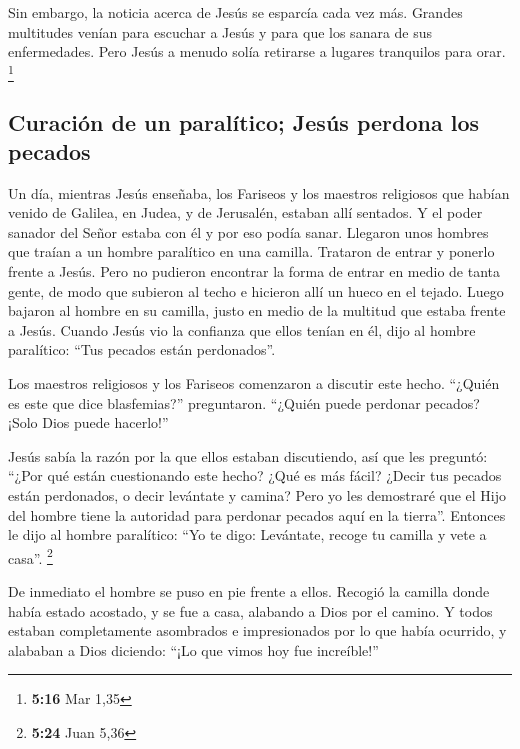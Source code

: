  Sin embargo, la noticia acerca de Jesús se esparcía cada
vez más. Grandes multitudes venían para escuchar a Jesús y para que los
sanara de sus enfermedades.  Pero Jesús a menudo solía
retirarse a lugares tranquilos para orar. \footnote{\textbf{5:16} Mar
  1,35}

\hypertarget{curaciuxf3n-de-un-paraluxedtico-jesuxfas-perdona-los-pecados}{%
\subsection{Curación de un paralítico; Jesús perdona los
pecados}\label{curaciuxf3n-de-un-paraluxedtico-jesuxfas-perdona-los-pecados}}

 Un día, mientras Jesús enseñaba, los Fariseos y los
maestros religiosos que habían venido de Galilea, en Judea, y de
Jerusalén, estaban allí sentados. Y el poder sanador del Señor estaba
con él y por eso podía sanar.  Llegaron unos hombres que
traían a un hombre paralítico en una camilla. Trataron de entrar y
ponerlo frente a Jesús.  Pero no pudieron encontrar la
forma de entrar en medio de tanta gente, de modo que subieron al techo e
hicieron allí un hueco en el tejado. Luego bajaron al hombre en su
camilla, justo en medio de la multitud que estaba frente a Jesús.
 Cuando Jesús vio la confianza que ellos tenían en él,
dijo al hombre paralítico: ``Tus pecados están perdonados''.

 Los maestros religiosos y los Fariseos comenzaron a
discutir este hecho. ``¿Quién es este que dice blasfemias?''
preguntaron. ``¿Quién puede perdonar pecados? ¡Solo Dios puede
hacerlo!''

 Jesús sabía la razón por la que ellos estaban
discutiendo, así que les preguntó: ``¿Por qué están cuestionando este
hecho?  ¿Qué es más fácil? ¿Decir tus pecados están
perdonados, o decir levántate y camina?  Pero yo les
demostraré que el Hijo del hombre tiene la autoridad para perdonar
pecados aquí en la tierra''. Entonces le dijo al hombre paralítico: ``Yo
te digo: Levántate, recoge tu camilla y vete a casa''. \footnote{\textbf{5:24}
  Juan 5,36}

 De inmediato el hombre se puso en pie frente a ellos.
Recogió la camilla donde había estado acostado, y se fue a casa,
alabando a Dios por el camino.  Y todos estaban
completamente asombrados e impresionados por lo que había ocurrido, y
alababan a Dios diciendo: ``¡Lo que vimos hoy fue increíble!''

